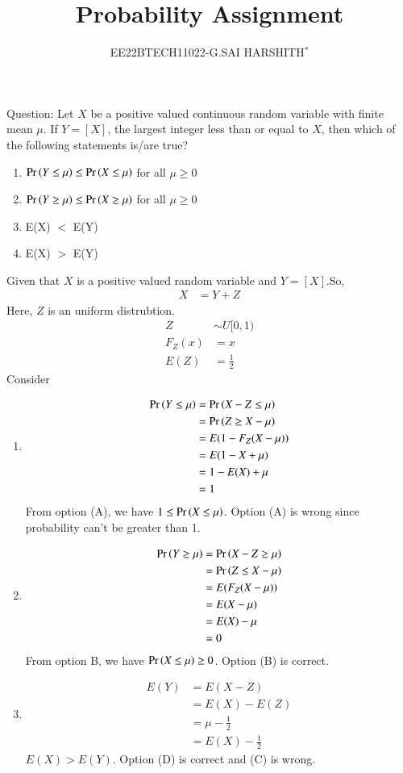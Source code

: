\documentclass[journal,12pt,twocolumn]{IEEEtran}
\theoremstyle{remark}
\begin{document}

\vspace{3cm}

\title{Probability Assignment}
\author{EE22BTECH11022-G.SAI HARSHITH$^{*}$%
}
\maketitle
\newpage
\bigskip
\renewcommand{\thefigure}{\theenumi}
\renewcommand{\thetable}{\theenumi}

Question: Let $X$ be a positive valued continuous random variable with finite mean $\mu$.
If $Y=[X]$, the largest integer less than or equal to $X$, then which of the
following statements is/are true?
\begin{enumerate}[label=(\Alph*)]
\item $\Pr\left(Y \leq \mu\right) \leq \Pr\left(X \leq \mu\right)$ for all $\mu \geq 0$
\item $\Pr\left(Y \geq \mu\right) \leq \Pr\left(X \geq \mu\right)$ for all $\mu \geq 0$
\item E(X) $<$ E(Y)
\item E(X) $>$ E(Y)
\end{enumerate}
\fi
\solution Given that $X$ is a positive valued random variable and $Y=[X]$.So,
\begin{align}
X&=Y+Z
\end{align}
Here, $Z$ is an uniform distrubtion.
\begin{align}
Z &\sim U[0,1)\\
F_Z(x)&=x\\
E(Z)&=\frac{1}{2}
\end{align}
Consider
\begin{enumerate}
\item 
\begin{align}
\Pr\left(Y \leq \mu\right)&=\Pr\left(X-Z \leq \mu\right)\\
&=\Pr\left(Z \geq X-\mu\right)\\
&=E(1-F_Z(X-\mu))\\
&=E(1-X+\mu)\\
&=1-E(X)+\mu\\
&=1
\end{align}
From option (A), we have $1 \leq \Pr\left(X \leq \mu\right)$. Option (A) is wrong since probability can't be greater than 1.
\item
\begin{align}
\Pr\left(Y \geq \mu\right)&=\Pr\left(X-Z \geq \mu\right)\\
&=\Pr\left(Z \leq X-\mu\right)\\
&=E(F_Z(X-\mu))\\
&=E(X-\mu)\\
&=E(X)-\mu\\
&=0
\end{align}
 From option B, we have $\Pr\left(X \leq \mu\right) \geq 0$. Option (B) is correct.
 \item
\begin{align}
E(Y)&=E(X-Z)\\
&=E(X)-E(Z)\\
&=\mu-\frac{1}{2}\\
&=E(X)-\frac{1}{2}
\end{align}
$E(X) > E(Y)$. Option (D) is correct and (C) is wrong.
\end{enumerate}
\end{document}
